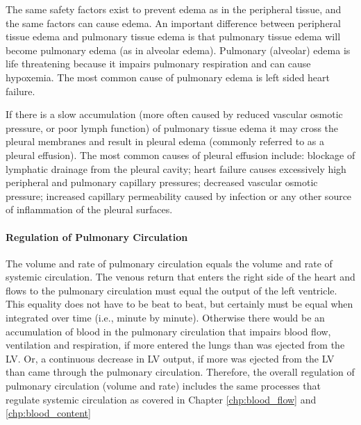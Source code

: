 The same safety factors exist to prevent edema as in the peripheral tissue, and the same factors can cause edema. An important difference between peripheral tissue edema and pulmonary tissue edema is that pulmonary tissue edema will become pulmonary edema (as in alveolar edema). Pulmonary (alveolar) edema is life threatening because it impairs pulmonary respiration and can cause hypoxemia. The most common cause of pulmonary edema is left sided heart failure. 

If there is a slow accumulation (more often caused by reduced vascular osmotic pressure, or poor lymph function) of pulmonary tissue edema it may cross the pleural membranes and result in pleural edema (commonly referred to as a pleural effusion). The most common causes of pleural effusion include: blockage of lymphatic drainage from the pleural cavity; heart failure causes excessively high peripheral and pulmonary capillary pressures;  decreased vascular osmotic pressure; increased capillary permeability caused by infection or any other source of inflammation of the pleural surfaces.

\paragraph{Regulation of Pulmonary Circulation}

The volume and rate of pulmonary circulation equals the volume and rate of systemic circulation. The venous return that enters the right side of the heart and flows to the pulmonary circulation must equal the output of the left ventricle. This equality does not have to be beat to beat, but certainly must be equal when integrated over time (i.e., minute by minute). Otherwise there would be an accumulation of blood in the pulmonary circulation that impairs blood flow, ventilation and respiration, if more entered the lungs than was ejected from the LV. Or, a continuous decrease in LV output, if more was ejected from the LV than came through the pulmonary circulation. Therefore, the overall regulation of pulmonary circulation (volume and rate) includes the same processes that regulate systemic circulation as covered in Chapter \ref{chp:blood_flow} and \ref{chp:blood_content}

